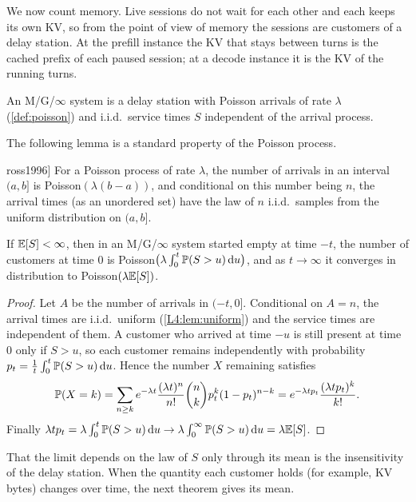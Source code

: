We now count memory. Live sessions do not wait for each other and each keeps its
own KV, so from the point of view of memory the sessions are customers of a delay
station. At the prefill instance the KV that stays between turns is the cached
prefix of each paused session; at a decode instance it is the KV of the running
turns.

\begin{definition}[M/G/$\infty$]\label{L4:def:mginf}
An M/G/$\infty$ system is a delay station with Poisson arrivals of rate $\lambda$
(\cref{def:poisson}) and i.i.d.\ service times $S$ independent of the arrival
process.
\end{definition}

The following lemma is a standard property of the Poisson process.

\begin{lemma}[Conditional uniformity \cite[\S2.3]{ross1996}]\label{L4:lem:uniform}
For a Poisson process of rate $\lambda$, the number of arrivals in an interval
$(a,b]$ is Poisson$(\lambda(b-a))$, and conditional on this number being $n$, the
arrival times (as an unordered set) have the law of $n$ i.i.d.\ samples from the
uniform distribution on $(a,b]$.
\end{lemma}

\begin{proposition}\label{L4:prop:mginf}
If $\mathbb{E}[S]<\infty$, then in an M/G/$\infty$ system started empty at time $-t$, the
number of customers at time $0$ is
Poisson$\bigl(\lambda\int_0^t\mathbb{P}(S>u)\,\mathrm{d} u\bigr)$, and as $t\to\infty$ it
converges in distribution to Poisson$(\lambda\mathbb{E}[S])$.
\end{proposition}

\begin{proof}
Let $A$ be the number of arrivals in $(-t,0]$. Conditional on $A=n$, the arrival
times are i.i.d.\ uniform (\cref{L4:lem:uniform}) and the service times are
independent of them. A customer who arrived at time $-u$ is still present at time
$0$ only if $S>u$, so each customer remains independently with probability
$p_t=\frac1t\int_0^t\mathbb{P}(S>u)\,\mathrm{d} u$. Hence the number $X$ remaining satisfies
\[
  \mathbb{P}(X=k)=\sum_{n\ge k}e^{-\lambda t}\frac{(\lambda t)^n}{n!}\binom nk p_t^k(1-p_t)^{n-k}
  =e^{-\lambda tp_t}\frac{(\lambda tp_t)^k}{k!} .
\]
Finally $\lambda tp_t=\lambda\int_0^t\mathbb{P}(S>u)\,\mathrm{d} u\to\lambda\int_0^\infty\mathbb{P}(S>u)\,\mathrm{d} u=\lambda\mathbb{E}[S]$.
\end{proof}

That the limit depends on the law of $S$ only through its mean is the
insensitivity of the delay station. When the quantity each customer holds (for
example, KV bytes) changes over time, the next theorem gives its mean.

